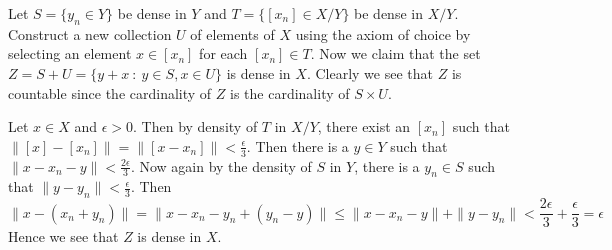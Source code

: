 \documentclass[12pt]{exam}
\theoremstyle{plain} %
\theoremstyle{definition} %
\theoremstyle{remark} %
\begin{document}
\begin{questions}
  \question
  \begin{solution}
    Let $S = \{ y_n \in Y \}$ be dense in $Y$ and $T = \{ [x_n] \in X/Y \}$ be dense in $X/Y$. Construct a new collection $U$ of elements of $X$ using the axiom of choice by selecting an element $x \in [x_n]$ for each $[x_n] \in T$. Now we claim that the set $Z = S+U = \{ y+x  \ : \  y \in S, x \in U \}$ is dense in $X$. Clearly we see that $Z$ is countable since the cardinality of $Z$ is the cardinality of $S \times U$.

    Let $x \in X$ and $\epsilon > 0$. Then by density of $T$ in $X/Y$, there exist an $[x_n]$ such that $\|[x] - [x_n]\| = \|[x - x_n]\| < \frac{\epsilon}{3}$. Then there is a $y \in Y$ such that $\|x - x_n - y\|  < \frac{2\epsilon}{3}$. Now again by the density of $S$ in $Y$, there is a $y_n \in S$  such that $\|y - y_n\| < \frac{\epsilon}{3}$. Then \[
      \|x - (x_n + y_n)\| = \|x - x_n - y_n + (y_n - y)\| \le \|x - x_n - y\| + \|y - y_n\| < \frac{2\epsilon}{3} + \frac{\epsilon}{3} = \epsilon
    \]
     Hence we see that $Z$ is dense in $X$.
  \end{solution}


\end{questions}
\printbibliography[heading=bibintoc]
\end{document}
